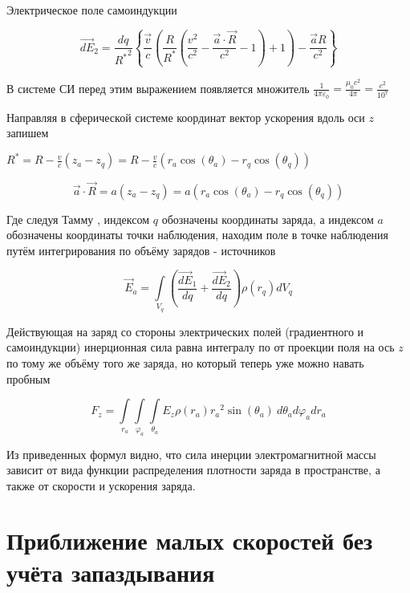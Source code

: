 \documentclass[11pt]{article}
\begin{document}
    Электрическое поле самоиндукции

\[\overrightarrow{dE}_{2}=\frac{dq}{{{R}^{*}}^{2}}\left\{ \frac{\overrightarrow{v}}{c}\left( \frac{R}{{{R}^{*}}}\left( \frac{{{v}^{2}}}{{{c}^{2}}}-\frac{\overrightarrow{a}\cdot \overrightarrow{R}}{{{c}^{2}}}-1 \right)+1 \right)-\frac{\overrightarrow{a}R}{{{c}^{2}}} \right\}\]

В системе СИ перед этим выражением появляется множитель
\(\frac{1}{4\pi {{\varepsilon }_{0}}}=\frac{{{\mu }_{0}}{{c}^{2}}}{4\pi }=\frac{{{c}^{2}}}{{{10}^{7}}}\)

    Направляя в сферической системе координат вектор ускорения вдоль оси
\(z\) запишем

\({{R}^{*}}=R-\frac{v}{c}\left( {{z}_{a}}-{{z}_{q}} \right)=R-\frac{v}{c}\left( {{r}_{a}}\cos \left( {{\theta }_{a}} \right)-{{r}_{q}}\cos \left( {{\theta }_{q}} \right) \right)\)

\[\overrightarrow{a}\cdot \overrightarrow{R}=a\left( {{z}_{a}}-{{z}_{q}} \right)=a\left( {{r}_{a}}\cos \left( {{\theta }_{a}} \right)-{{r}_{q}}\cos \left( {{\theta }_{q}} \right) \right)\]

Где следуя Тамму \cite{tamm}, индексом \(q\) обозначены координаты
заряда, а индексом \(a\) обозначены координаты точки наблюдения, находим
поле в точке наблюдения путём интегрирования по объёму зарядов -
источников

\[\overrightarrow{E}_{a}=\int\limits_{{{V}_{q}}}
{\left(\frac{\overrightarrow{dE}_{1}}{dq}+\frac{\overrightarrow{dE}_{2}}{dq}\right)\rho \left( {{r}_{q}} \right) }d{{V }_{q}}\]

    Действующая на заряд со стороны электрических полей (градиентного и
самоиндукции) инерционная сила равна интегралу по от проекции поля на
ось \(z\) по тому же объёму того же заряда, но который теперь уже можно
навать пробным

\[{F}_{z}=\int\limits_{{{r}_{a}}}\int\limits_{{{\varphi}_{a}}}\int\limits_{{{\theta}_{a}}}{{E}_{z}\rho \left( {{r}_{a}} \right){{r}_{a}}^{2}\sin \left( {{\theta }_{a}} \right)}\ d{{\theta }_{a}}d{{\varphi }_{a}}d{{r}_{a}}\]

Из приведенных формул видно, что сила инерции электромагнитной массы
зависит от вида функции распределения плотности заряда в пространстве, а
также от скорости и ускорения заряда.

    \section{Приближение малых скоростей без учёта
запаздывания}\label{ux43fux440ux438ux431ux43bux438ux436ux435ux43dux438ux435-ux43cux430ux43bux44bux445-ux441ux43aux43eux440ux43eux441ux442ux435ux439-ux431ux435ux437-ux443ux447ux451ux442ux430-ux437ux430ux43fux430ux437ux434ux44bux432ux430ux43dux438ux44f}
\end{document}
